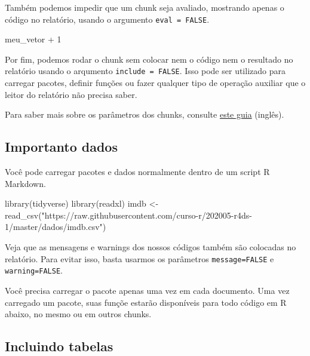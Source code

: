 \documentclass[
]{article}
\newenvironment{Shaded}{\begin{snugshade}}{\end{snugshade}}
\newcommand{\DecValTok}[1]{\textcolor[rgb]{0.00,0.00,0.81}{#1}}
\newcommand{\FunctionTok}[1]{\textcolor[rgb]{0.00,0.00,0.00}{#1}}
\newcommand{\NormalTok}[1]{#1}
\newcommand{\OtherTok}[1]{\textcolor[rgb]{0.56,0.35,0.01}{#1}}
\newcommand{\SpecialCharTok}[1]{\textcolor[rgb]{0.00,0.00,0.00}{#1}}
\newcommand{\StringTok}[1]{\textcolor[rgb]{0.31,0.60,0.02}{#1}}
\begin{document}
Também podemos impedir que um chunk seja avaliado, mostrando apenas o
código no relatório, usando o argumento \texttt{eval\ =\ FALSE}.

\begin{Shaded}
\begin{Highlighting}[]
\NormalTok{meu\_vetor }\SpecialCharTok{+} \DecValTok{1}
\end{Highlighting}
\end{Shaded}

Por fim, podemos rodar o chunk sem colocar nem o código nem o resultado
no relatório usando o arqumento \texttt{include\ =\ FALSE}. Isso pode
ser utilizado para carregar pacotes, definir funções ou fazer qualquer
tipo de operação auxiliar que o leitor do relatório não precisa saber.

Para saber mais sobre os parâmetros dos chunks, consulte
\href{https://www.rstudio.com/wp-content/uploads/2015/03/rmarkdown-reference.pdf}{este
guia} (inglês).

\hypertarget{importanto-dados}{%
\subsection{Importanto dados}\label{importanto-dados}}

Você pode carregar pacotes e dados normalmente dentro de um script R
Markdown.

\begin{Shaded}
\begin{Highlighting}[]
\FunctionTok{library}\NormalTok{(tidyverse)}
\FunctionTok{library}\NormalTok{(readxl)}
\NormalTok{imdb }\OtherTok{\textless{}{-}} \FunctionTok{read\_csv}\NormalTok{(}\StringTok{"https://raw.githubusercontent.com/curso{-}r/202005{-}r4ds{-}1/master/dados/imdb.csv"}\NormalTok{)}
\end{Highlighting}
\end{Shaded}

Veja que as mensagens e warnings dos nossos códigos também são colocadas
no relatório. Para evitar isso, basta usarmos os parâmetros
\texttt{message=FALSE} e \texttt{warning=FALSE}.

Você precisa carregar o pacote apenas uma vez em cada documento. Uma vez
carregado um pacote, suas funçõe estarão disponíveis para todo código em
R abaixo, no mesmo ou em outros chunks.

\hypertarget{incluindo-tabelas}{%
\subsection{Incluindo tabelas}\label{incluindo-tabelas}}
\end{document}
